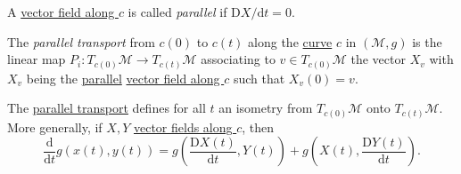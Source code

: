 \begin{definition}[Parallel]\label{def:parallel}
	A \hyperref[def:vector-field-along-a-curve]{vector field along \(c\)} is called \emph{parallel} if \(\mathrm{D} X/ \mathrm{d} t = 0\).
\end{definition}

\begin{definition}\label{def:parallel-transport}
	The \emph{parallel transport} from \(c(0)\) to \(c(t)\) along the \hyperref[def:curve]{curve} \(c\) in \((\mathcal{M} , g)\) is the linear map \(P_i \colon T_{c(0)} \mathcal{M} \to T_{c(t) }\mathcal{M} \) associating to \(v\in T_{c(0)} \mathcal{M} \) the vector \(X_v\) with \(X_v\) being the \hyperref[def:parallel]{parallel} \hyperref[def:vector-field-along-a-curve]{vector field along \(c\)} such that \(X_v (0) =v\).
\end{definition}

\begin{proposition}
	The \hyperref[def:parallel-transport]{parallel transport} defines for all \(t\) an isometry from \(T_{c(0)} \mathcal{M} \) onto \(T_{c(t)} \mathcal{M} \). More generally, if \(X, Y\) \hyperref[def:vector-field-along-a-curve]{vector fields along \(c\)}, then
	\[
		\frac{\mathrm{d}}{\mathrm{d}t} g(x(t), y(t))
		= g\left( \frac{\mathrm{D} X(t)}{\mathrm{d} t}, Y(t)\right) + g\left(X(t), \frac{\mathrm{D} Y(t)}{\mathrm{d} t} \right) .
	\]
\end{proposition}